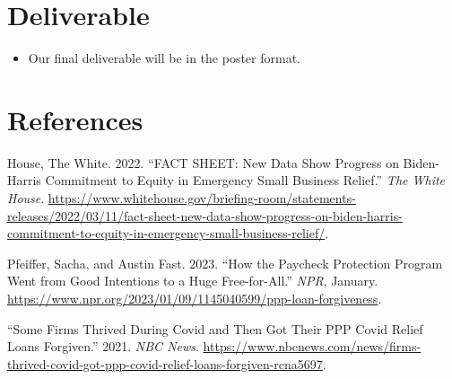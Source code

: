 \documentclass[
  letterpaper,
  DIV=11,
  numbers=noendperiod]{scrartcl}
\providecommand{\tightlist}{%
  \setlength{\itemsep}{0pt}\setlength{\parskip}{0pt}}\usepackage{longtable,booktabs,array}
\newlength{\cslhangindent}
\newlength{\cslentryspacingunit} %
\newenvironment{CSLReferences}[2] %
 {%
  \setlength{\parindent}{0pt}
  \ifodd #1
  \let\oldpar\par
  \def\par{\hangindent=\cslhangindent\oldpar}
  \fi
  \setlength{\parskip}{#2\cslentryspacingunit}
 }%
 {}
\begin{document}
\hypertarget{deliverable}{%
\section{Deliverable}\label{deliverable}}

\begin{itemize}
\tightlist
\item
  Our final deliverable will be in the poster format.
\end{itemize}

\hypertarget{references}{%
\section*{References}\label{references}}

\hypertarget{refs}{}
\begin{CSLReferences}{1}{0}
\leavevmode{}%
House, The White. 2022. {``{FACT} {SHEET}: {New} {Data} {Show}
{Progress} on {Biden}-{Harris} {Commitment} to {Equity} in {Emergency}
{Small} {Business} {Relief}.''} \emph{The White House}.
\url{https://www.whitehouse.gov/briefing-room/statements-releases/2022/03/11/fact-sheet-new-data-show-progress-on-biden-harris-commitment-to-equity-in-emergency-small-business-relief/}.

\leavevmode{}%
Pfeiffer, Sacha, and Austin Fast. 2023. {``How the {Paycheck}
{Protection} {Program} Went from Good Intentions to a Huge
Free-for-All.''} \emph{NPR}, January.
\url{https://www.npr.org/2023/01/09/1145040599/ppp-loan-forgiveness}.

\leavevmode{}%
{``Some Firms Thrived During {Covid} and Then Got Their {PPP} {Covid}
Relief Loans Forgiven.''} 2021. \emph{NBC News}.
\url{https://www.nbcnews.com/news/firms-thrived-covid-got-ppp-covid-relief-loans-forgiven-rcna5697}.

\end{CSLReferences}
\end{document}
